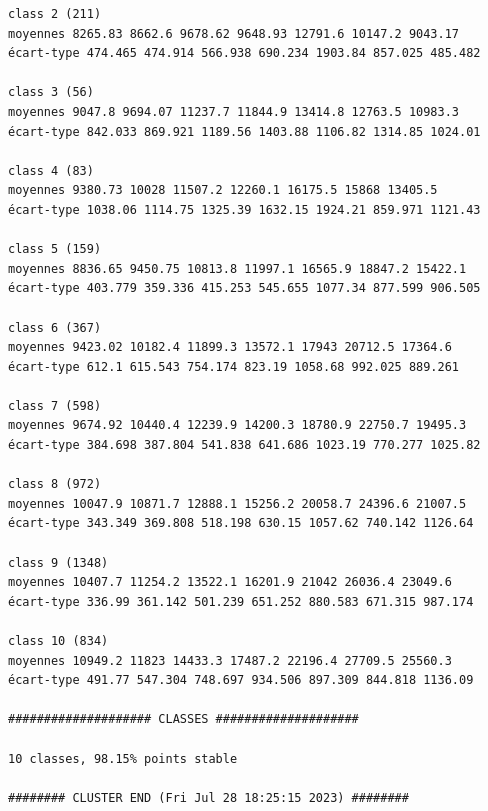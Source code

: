 \documentclass[earth,article,submit,pdftex,moreauthors]{Definitions/mdpi}
\begin{document}
\begin{scriptsize}
\begin{verbatim}
class 2 (211)
moyennes 8265.83 8662.6 9678.62 9648.93 12791.6 10147.2 9043.17
écart-type 474.465 474.914 566.938 690.234 1903.84 857.025 485.482

class 3 (56)
moyennes 9047.8 9694.07 11237.7 11844.9 13414.8 12763.5 10983.3
écart-type 842.033 869.921 1189.56 1403.88 1106.82 1314.85 1024.01

class 4 (83)
moyennes 9380.73 10028 11507.2 12260.1 16175.5 15868 13405.5
écart-type 1038.06 1114.75 1325.39 1632.15 1924.21 859.971 1121.43

class 5 (159)
moyennes 8836.65 9450.75 10813.8 11997.1 16565.9 18847.2 15422.1
écart-type 403.779 359.336 415.253 545.655 1077.34 877.599 906.505

class 6 (367)
moyennes 9423.02 10182.4 11899.3 13572.1 17943 20712.5 17364.6
écart-type 612.1 615.543 754.174 823.19 1058.68 992.025 889.261

class 7 (598)
moyennes 9674.92 10440.4 12239.9 14200.3 18780.9 22750.7 19495.3
écart-type 384.698 387.804 541.838 641.686 1023.19 770.277 1025.82

class 8 (972)
moyennes 10047.9 10871.7 12888.1 15256.2 20058.7 24396.6 21007.5
écart-type 343.349 369.808 518.198 630.15 1057.62 740.142 1126.64

class 9 (1348)
moyennes 10407.7 11254.2 13522.1 16201.9 21042 26036.4 23049.6
écart-type 336.99 361.142 501.239 651.252 880.583 671.315 987.174

class 10 (834)
moyennes 10949.2 11823 14433.3 17487.2 22196.4 27709.5 25560.3
écart-type 491.77 547.304 748.697 934.506 897.309 844.818 1136.09

#################### CLASSES ####################

10 classes, 98.15% points stable

######## CLUSTER END (Fri Jul 28 18:25:15 2023) ########

\end{verbatim}
\end{scriptsize}
\end{document}
